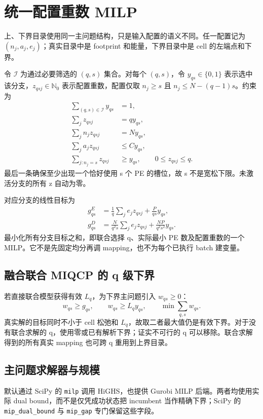 \documentclass[UTF8,11pt,a4paper,fontset=fandol]{ctexart}
\newcommand{\NN}{\mathbb N}
\theoremstyle{remark}\newtheorem{remark}[proposition]{说明}
\numberwithin{equation}{section}
\begin{document}
\section{统一配置重数 MILP}
\label{sec:master}
上、下界目录使用同一主问题结构，只是输入配置的语义不同。任一配置记为 $(n_j,a_j,e_j)$；真实目录中是 footprint 和能量，下界目录中是 cell 的左端点和下界。

令 $\mathcal I$ 为通过必要筛选的 $(q,s)$ 集合。对每个 $(q,s)$，令 $y_{qs}\in\{0,1\}$ 表示选中该分支，$z_{qsj}\in\NN_0$ 表示配置重数，配置仅取 $n_j\ge s$ 且 $n_j\le N-(q-1)s$。约束为
\begin{align}
\sum_{(q,s)\in\mathcal I}y_{qs}&=1,\\
\sum_jz_{qsj}&=q y_{qs},\label{eq:master-count}\\
\sum_jn_jz_{qsj}&=N y_{qs},\\
\sum_ja_jz_{qsj}&\le C y_{qs},\\
\sum_{j:n_j=s}z_{qsj}&\ge y_{qs},\qquad 0\le z_{qsj}\le q.
\label{eq:master-min}
\end{align}
最后一条确保至少出现一个恰好使用 s 个 PE 的槽位，故 s 不是宽松下限。未激活分支的所有 z 自动为零。

对应分支的线性目标为
\begin{align}
g^E_{qs}&=\frac1q\sum_je_jz_{qsj}+\frac{P}{qs}y_{qs},\\
g^D_{qs}&=\frac{N}{q^2s}\sum_je_jz_{qsj}+\frac{NP}{q^2s^2}y_{qs}.
\label{eq:master-cost}
\end{align}
最小化所有分支目标之和，即联合选择 q、实际最小 PE 数及配置重数的一个 MILP。它不是先固定均分再调 mapping，也不为每个已执行 batch 建变量。

\subsection{融合联合 MIQCP 的 q 级下界}
若直接联合模型获得有效 $L_q$，为下界主问题引入 $w_{qs}\ge0$：
\begin{equation}
w_{qs}\ge g_{qs},\qquad w_{qs}\ge L_qy_{qs},\qquad
\min\sum_{q,s}w_{qs}.
\label{eq:master-epigraph}
\end{equation}
真实解的目标同时不小于 cell 松弛和 $L_q$，故取二者最大值仍是有效下界。对于没有联合求解的 q，使用零或已有解析下界；证实不可行的 q 可以移除。联合求解得到的所有真实 mapping 也可跨 q 重用到上界目录。

\subsection{主问题求解器与规模}
默认通过 SciPy 的 \texttt{milp} 调用 HiGHS，也提供 Gurobi MILP 后端。两者均使用实际 dual bound，而不是仅凭成功状态把 incumbent 当作精确下界；SciPy 的 \texttt{mip\_dual\_bound} 与 \texttt{mip\_gap} 专门保留这些字段\cite{scipy}。
\end{document}
